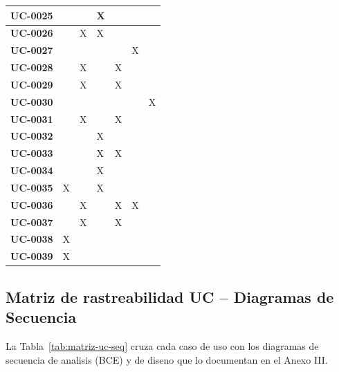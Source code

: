 \documentclass[11pt, a4paper]{article}
\begin{document}
{\begin{center}
{\begin{longtable}{|p{2.2cm}|p{2.0cm}|p{2.0cm}|p{2.0cm}|p{2.0cm}|p{2.0cm}|p{2.0cm}|}
\hline
\textbf{UC-0025} &  &  & X &  &  &  \\
\hline
\textbf{UC-0026} &  & X & X &  &  &  \\
\hline
\textbf{UC-0027} &  &  &  &  & X &  \\
\hline
\textbf{UC-0028} &  & X &  & X &  &  \\
\hline
\textbf{UC-0029} &  & X &  & X &  &  \\
\hline
\textbf{UC-0030} &  &  &  &  &  & X \\
\hline
\textbf{UC-0031} &  & X &  & X &  &  \\
\hline
\textbf{UC-0032} &  &  & X &  &  &  \\
\hline
\textbf{UC-0033} &  &  & X & X &  &  \\
\hline
\textbf{UC-0034} &  &  & X &  &  &  \\
\hline
\textbf{UC-0035} & X &  & X &  &  &  \\
\hline
\textbf{UC-0036} &  & X &  & X & X &  \\
\hline
\textbf{UC-0037} &  & X &  & X &  &  \\
\hline
\textbf{UC-0038} & X &  &  &  &  &  \\
\hline
\textbf{UC-0039} & X &  &  &  &  &  \\
\hline

\end{longtable}
}
\end{center}

\subsection{Matriz de rastreabilidad UC -- Diagramas de Secuencia}

La Tabla~\ref{tab:matriz-uc-seq} cruza cada caso de uso con los diagramas de secuencia de analisis (BCE) y de diseno que lo documentan en el Anexo III.

}
\end{document}
